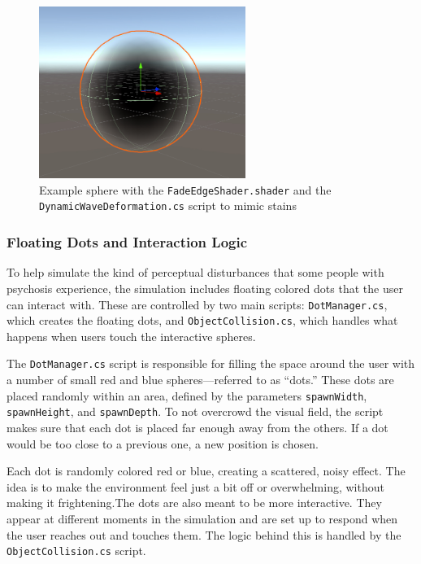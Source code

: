 \begin{figure}[h!] 
    \centering 
    \includegraphics[width=0.6\textwidth]{../../Figures/fadeedgeshader.jpg} 
    \caption{Example sphere with the \texttt{FadeEdgeShader.shader} and the \texttt{DynamicWaveDeformation.cs} script to mimic stains} 
    \label{fig:fadeedgeshader} 
\end{figure}

\subsubsection{Floating Dots and Interaction Logic}

To help simulate the kind of perceptual disturbances that some people with psychosis experience, the simulation includes floating colored dots that the user can interact with. These are controlled by two main scripts: \texttt{DotManager.cs}, which creates the floating dots, and \texttt{ObjectCollision.cs}, which handles what happens when users touch the interactive spheres.

\vspace{1em}

The \texttt{DotManager.cs} script is responsible for filling the space around the user with a number of small red and blue spheres—referred to as “dots.” These dots are placed randomly within an area, defined by the parameters \texttt{spawnWidth}, \texttt{spawnHeight}, and \texttt{spawnDepth}. To not overcrowd the visual field, the script makes sure that each dot is placed far enough away from the others. If a dot would be too close to a previous one, a new position is chosen.

\vspace{1em}

Each dot is randomly colored red or blue, creating a scattered, noisy effect. The idea is to make the environment feel just a bit off or overwhelming, without making it frightening.The dots are also meant to be more interactive. They appear at different moments in the simulation and are set up to respond when the user reaches out and touches them. The logic behind this is handled by the \texttt{ObjectCollision.cs} script.


